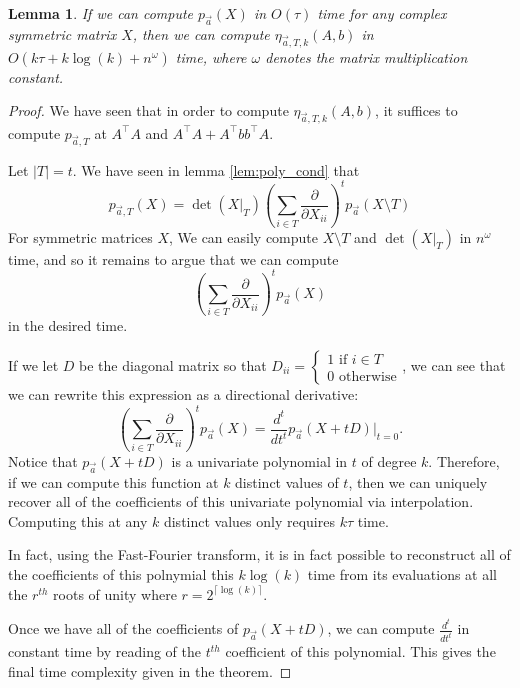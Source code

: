 \documentclass{amsart}
\newtheorem{lemma}[thm]{Lemma}
\theoremstyle{definition}
\numberwithin{equation}{section}
\begin{document}
\begin{lemma}
    If we can compute $p_{\vec{a}}(X)$ in $O(\tau)$ time for any complex symmetric matrix $X$, then we can compute  $\eta_{\vec{a}, T, k}(A, b)$ in $O(k\tau + k\log(k) + n^\omega)$ time, where $\omega$ denotes the matrix multiplication constant.
\end{lemma}
\begin{proof}

    We have seen that in order to compute $\eta_{\vec{a}, T, k}(A, b)$, it suffices to compute $p_{\vec{a}, T}$ at $A^{\intercal}A$ and $A^{\intercal}A+A^{\intercal}bb^{\intercal}A$.

    Let $|T| = t$.
    We have seen in lemma \ref{lem:poly_cond} that
    \[
        p_{\vec{a}, T}(X) = \det(X|_T) \left( \sum_{i \in T} \frac{\partial}{\partial X_{ii}} \right)^{t}p_{\vec{a}}(X \setminus T) 
    \]
    For symmetric matrices $X$, We can easily compute $X \setminus T$ and $\det(X|_T)$ in $n^{\omega}$ time, and so it remains to argue that we can compute 
    \[
         \left( \sum_{i \in T} \frac{\partial}{\partial X_{ii}} \right)^{t}p_{\vec{a}}(X)
    \]
    in the desired time.

    If we let $D$ be the diagonal matrix so that $D_{ii} = \begin{cases} 1 \text{ if }i \in T\\0 \text{ otherwise}\end{cases}$, we can see that we can rewrite this expression as a directional derivative:
    \[
        \left( \sum_{i \in T} \frac{\partial}{\partial X_{ii}} \right)^{t}p_{\vec{a}}(X) = \frac{d^{t}}{dt^{t}} p_{\vec{a}}(X + tD)|_{t = 0}. 
    \]
    Notice that $p_{\vec{a}}(X + tD)$ is a univariate polynomial in $t$ of degree $k$.
    Therefore, if we can compute this function at $k$ distinct values of $t$, then we can uniquely recover all of the coefficients of this univariate polynomial via interpolation.
    Computing this at any $k$ distinct values only requires $k\tau$ time.

    In fact, using the Fast-Fourier transform, it is in fact possible to reconstruct all of the coefficients of this polnymial this $k\log(k)$ time from its evaluations at all the $r^{th}$ roots of unity where $r = 2^{\lceil \log(k) \rceil}$.

    Once we have all of the coefficients of $p_{\vec{a}}(X + tD)$, we can compute $\frac{d^{t}}{dt^{t}}$ in constant time by reading of the $t^{th}$ coefficient of this polynomial.
    This gives the final time complexity given in the theorem.
\end{proof}
\end{document}
